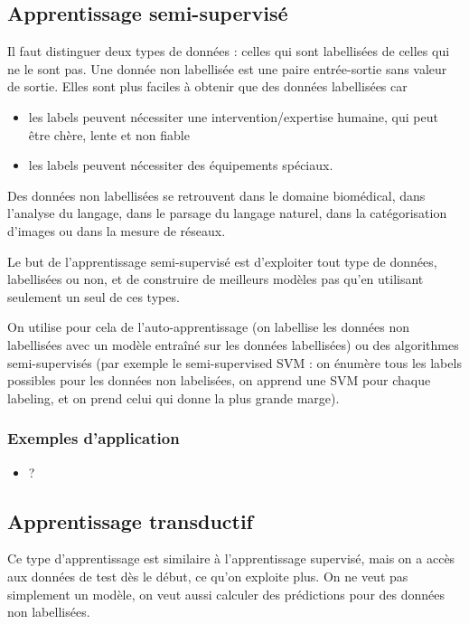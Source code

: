 		\subsection{Apprentissage semi-supervisé}
		
		Il faut distinguer deux types de données : celles qui sont labellisées de celles qui ne le sont pas. Une donnée non labellisée est une paire entrée-sortie sans valeur de sortie. Elles sont plus faciles à obtenir que des données labellisées car
		
		\begin{itemize}
			\item les labels peuvent nécessiter une intervention/expertise humaine, qui peut être chère, lente et non fiable
			\item les labels peuvent nécessiter des équipements spéciaux.
		\end{itemize}
		
		Des données non labellisées se retrouvent dans le domaine biomédical, dans l'analyse du langage, dans le parsage du langage naturel, dans la catégorisation d'images ou dans la mesure de réseaux.
				
		Le but de l'apprentissage semi-supervisé est d'exploiter tout type de données, labellisées ou non, et de construire de meilleurs modèles pas qu'en utilisant seulement un seul de ces types.
		
		On utilise pour cela de l'auto-apprentissage (on labellise les données non labellisées avec un modèle entraîné sur les données labellisées) ou des algorithmes semi-supervisés (par exemple le semi-supervised SVM : on énumère tous les labels possibles pour les données non labelisées, on apprend une SVM pour chaque labeling, et on prend celui qui donne la plus grande marge).
			
			\subsubsection{Exemples d'application}
			
			\begin{itemize}
				\item ?
			\end{itemize}
		
		\subsection{Apprentissage transductif}
		
		Ce type d'apprentissage est similaire à l'apprentissage supervisé, mais on a accès aux données de test dès le début, ce qu'on exploite plus. On ne veut pas simplement un modèle, on veut aussi calculer des prédictions pour des données non labellisées.
		
